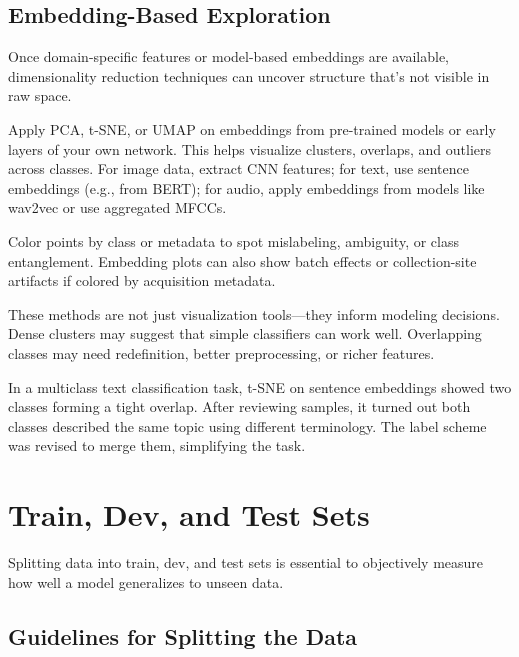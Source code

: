 \documentclass[12pt,openany, draft]{book}
\begin{document}
\section{Embedding-Based Exploration}

Once domain-specific features or model-based embeddings are available, dimensionality reduction techniques can uncover structure that’s not visible in raw space.
\newline

Apply PCA, t-SNE, or UMAP on embeddings from pre-trained models or early layers of your own network. This helps visualize clusters, overlaps, and outliers across classes. For image data, extract CNN features; for text, use sentence embeddings (e.g., from BERT); for audio, apply embeddings from models like wav2vec or use aggregated MFCCs.
\newline

Color points by class or metadata to spot mislabeling, ambiguity, or class entanglement. Embedding plots can also show batch effects or collection-site artifacts if colored by acquisition metadata.
\newline

These methods are not just visualization tools—they inform modeling decisions. Dense clusters may suggest that simple classifiers can work well. Overlapping classes may need redefinition, better preprocessing, or richer features.

\begin{examplebox}
In a multiclass text classification task, t-SNE on sentence embeddings showed two classes forming a tight overlap. After reviewing samples, it turned out both classes described the same topic using different terminology. The label scheme was revised to merge them, simplifying the task.
\end{examplebox}




\chapter{Train, Dev, and Test Sets}


Splitting data into train, dev, and test sets is essential to objectively measure how well a model generalizes to unseen data.


\section{Guidelines for Splitting the Data}
\end{document}
